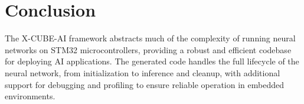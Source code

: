 \documentclass{article}
\begin{document}
\section*{Conclusion}
The X-CUBE-AI framework abstracts much of the complexity of running neural networks on STM32 microcontrollers, providing a robust and efficient codebase for deploying AI applications. The generated code handles the full lifecycle of the neural network, from initialization to inference and cleanup, with additional support for debugging and profiling to ensure reliable operation in embedded environments.
\end{document}
